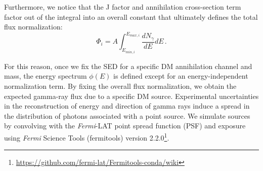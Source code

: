 \documentclass[12pt, a4paper]{article}
\newcommand{\aure}[1]{\textcolor{orange}{[AA: #1]}}
\newcommand{\Fermi}{{\textit{Fermi}}}
\begin{document}
Furthermore, we notice that the J factor and annihilation cross-section term factor out of the integral into an overall constant that ultimately defines the total flux normalization: 
\begin{equation}
   \Phi_i = A \int_{E_{min, i}}^{E_{max,i} }\frac{dN_\gamma}{dE}dE \,.
\end{equation}

For this reason, once we fix the SED for a specific DM annihilation channel and mass, the energy spectrum $\phi(E)$ is defined except for an energy-independent normalization term. 
By fixing the overall flux normalization, we obtain the expected gamma-ray flux due to a specific DM source. 
Experimental uncertainties in the reconstruction of energy and direction of gamma rays induce a spread in the distribution of photons associated with a point source.
We simulate sources by convolving with the \Fermi-LAT point spread function (PSF) and exposure
using {\Fermi} Science Tools (fermitools) version 2.2.0\footnote{\url{https://github.com/fermi-lat/Fermitools-conda/wiki}}.

\end{document}

